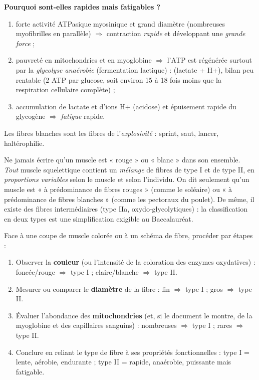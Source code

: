 \documentclass[11pt]{article}
\begin{document}
\textbf{Pourquoi sont-elles rapides mais fatigables ?}
\begin{enumerate}
\item forte activité ATPasique myosinique et grand diamètre (nombreuses myofibrilles en parallèle) $\Rightarrow$ contraction \emph{rapide} et développant une \emph{grande force} ;
\item pauvreté en mitochondries et en myoglobine $\Rightarrow$ l'ATP est régénérée surtout par la \emph{glycolyse anaérobie} (fermentation lactique) :  (lactate + H+), bilan peu rentable (2 ATP par glucose, soit environ 15 à 18 fois moins que la respiration cellulaire complète) ;
\item accumulation de lactate et d'ions H+ (acidose) et épuisement rapide du glycogène $\Rightarrow$ \emph{fatigue} rapide.
\end{enumerate}
Les fibres blanches sont les fibres de l'\emph{explosivité} : sprint, saut, lancer, haltérophilie.

\begin{attention}
Ne jamais écrire qu'un muscle est « rouge » ou « blanc » dans son ensemble. \emph{Tout} muscle squelettique contient un \emph{mélange} de fibres de type I et de type II, en \emph{proportions variables} selon le muscle et selon l'individu. On dit seulement qu'un muscle est « à prédominance de fibres rouges » (comme le soléaire) ou « à prédominance de fibres blanches » (comme les pectoraux du poulet). De même, il existe des fibres intermédiaires (type IIa, oxydo-glycolytiques) : la classification en deux types est une simplification exigible au Baccalauréat.
\end{attention}

\begin{methode}
Face à une coupe de muscle colorée ou à un schéma de fibre, procéder par étapes :
\begin{enumerate}
\item Observer la \textbf{couleur} (ou l'intensité de la coloration des enzymes oxydatives) : foncée/rouge $\Rightarrow$ type I ; claire/blanche $\Rightarrow$ type II.
\item Mesurer ou comparer le \textbf{diamètre} de la fibre : fin $\Rightarrow$ type I ; gros $\Rightarrow$ type II.
\item Évaluer l'abondance des \textbf{mitochondries} (et, si le document le montre, de la myoglobine et des capillaires sanguins) : nombreuses $\Rightarrow$ type I ; rares $\Rightarrow$ type II.
\item Conclure en reliant le type de fibre à ses propriétés fonctionnelles : type I = lente, aérobie, endurante ; type II = rapide, anaérobie, puissante mais fatigable.
\end{enumerate}
\end{methode}
\end{document}
